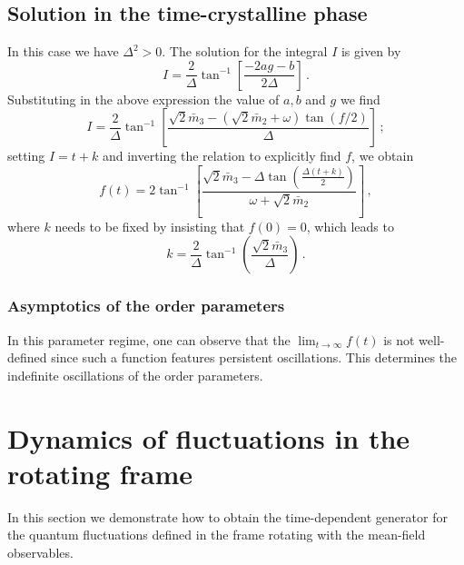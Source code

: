 \documentclass[prl,superscriptaddress,showpacs,longbibliography,reprint]{revtex4-2}
\begin{document}
\subsection{Solution in the time-crystalline phase}
In this case we have $\Delta^2>0$. The solution for the integral $I$ is given by 
$$
I=\frac{2}{\Delta}\tan^{-1}\left[\frac{-2ag -b}{2\Delta}\right]\, .
$$
Substituting in the above expression the value of $a,b$ and $g$ we find
$$
I=\frac{2}{\Delta}\tan^{-1}\left[\frac{\sqrt{2}\bar{m}_3-(\sqrt{2}\bar{m}_2+\omega)\tan(f/2)}{\Delta}\right]\, ;
$$
setting $I=t+k$ and inverting the relation to  explicitly find $f$, we obtain 
$$
f(t)=2\tan^{-1}\left[\frac{\sqrt{2}\bar{m}_3-\Delta\tan\left(\frac{\Delta (t+k)}{2}\right)}{\omega +\sqrt{2}\bar{m}_2}\right]\, ,
$$
where $k$ needs to be fixed by insisting that $f(0)=0$, which leads to 
$$
k=\frac{2}{\Delta}\tan^{-1} \left(\frac{\sqrt{2}\bar{m}_3}{\Delta}\right)\, .
$$
\subsubsection{Asymptotics of the order parameters}
In this parameter regime, one can observe that the $\lim_{t\to\infty}f(t)$ is not well-defined since such a function features persistent oscillations. This determines the indefinite oscillations of the order parameters. 



\section{Dynamics of fluctuations in the rotating frame}
In this section we demonstrate how to obtain the time-dependent generator for the quantum fluctuations defined in the frame rotating with the mean-field observables. 
\end{document}
